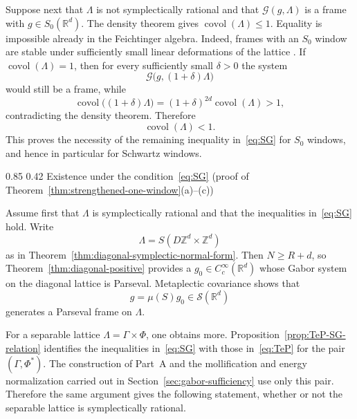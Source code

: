 \documentclass[11pt,reqno]{amsart}
\makeatletter
\numberwithin{equation}{section}
\renewcommand\subsection{\@startsection{subsection}{2}{\z@}%
  {0.85\baselineskip \@plus 0.25\baselineskip \@minus 0.10\baselineskip}%
  {0.42\baselineskip}%
  {\normalfont\bfseries}}
\theoremstyle{definition}
\theoremstyle{remark}
\newcommand{\R}{\mathbb R}
\newcommand{\Z}{\mathbb Z}
\newcommand{\covol}{\operatorname{covol}}
\newcommand{\G}{\mathcal G}
\newcommand{\Sclass}{\mathcal S}
\newcommand{\Szero}{S_0}
\makeatother
\begin{document}
Suppose next that $\Lambda$ is not symplectically rational and that
$\G(g,\Lambda)$ is a frame with $g\in\Szero(\R^d)$.  The density theorem
gives $\covol(\Lambda)\le1$.  Equality is impossible already in the
Feichtinger algebra.  Indeed, frames with an $S_0$ window are stable under
sufficiently small linear deformations of the lattice
\cite{FeichtingerKaiblinger2004,GrochenigOrtegaRomero2015}.  If
$\covol(\Lambda)=1$, then for every sufficiently small $\delta>0$ the system
\[
             \G\bigl(g,(1+\delta)\Lambda\bigr)
\]
would still be a frame, while
\[
 \covol\bigl((1+\delta)\Lambda\bigr)
       =(1+\delta)^{2d}\covol(\Lambda)>1,
\]
contradicting the density theorem.  Therefore
\begin{equation}\label{eq:nonrational-necessity}
                         \covol(\Lambda)<1.
\end{equation}
This proves the necessity of the remaining inequality in~\eqref{eq:SG} for $S_0$
windows, and hence in particular for Schwartz windows.

\subsection{Existence under the condition~\eqref{eq:SG} (proof of Theorem~\ref{thm:strengthened-one-window}\textup{(a)--(c)})}
\label{sec:general-existence}

Assume first that $\Lambda$ is symplectically rational and that the inequalities in~\eqref{eq:SG} hold.
Write
\[
                         \Lambda=S(D\Z^d\times\Z^d)
\]
as in Theorem~\ref{thm:diagonal-symplectic-normal-form}.  Then
$N\ge R+d$, so Theorem~\ref{thm:diagonal-positive} provides a
$g_0\in C_c^\infty(\R^d)$ whose Gabor system on the diagonal lattice is
Parseval.  Metaplectic covariance shows that
\[
                         g=\mu(S)g_0\in\Sclass(\R^d)
\]
generates a Parseval frame on $\Lambda$.

For a separable lattice $\Lambda=\Gamma\times\Phi$, one obtains more.
Proposition~\ref{prop:TeP-SG-relation} identifies the inequalities in~\eqref{eq:SG} with those in~\eqref{eq:TeP} for the
pair $(\Gamma,\Phi^*)$.  The construction of Part~A and the mollification
and energy normalization carried out in
Section~\ref{sec:gabor-sufficiency} use only this pair.  Therefore the same
argument gives the following statement, whether or not the separable lattice
is symplectically rational.
\end{document}
